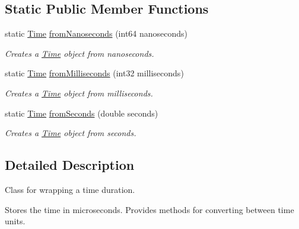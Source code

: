 \subsection*{Static Public Member Functions}
\begin{DoxyCompactItemize}
\item 
\mbox{\label{class_arcana_1_1_time_a82db96262751ea46d56f0fc6388efbcf}} 
static \mbox{\hyperlink{class_arcana_1_1_time}{Time}} \mbox{\hyperlink{class_arcana_1_1_time_a82db96262751ea46d56f0fc6388efbcf}{from\+Nanoseconds}} (int64 nanoseconds)
\begin{DoxyCompactList}\small\item\em Creates a \mbox{\hyperlink{class_arcana_1_1_time}{Time}} object from nanoseconds. \end{DoxyCompactList}\item 
\mbox{\label{class_arcana_1_1_time_a95ac577d056c4909dbf4d9cb43c64383}} 
static \mbox{\hyperlink{class_arcana_1_1_time}{Time}} \mbox{\hyperlink{class_arcana_1_1_time_a95ac577d056c4909dbf4d9cb43c64383}{from\+Milliseconds}} (int32 milliseconds)
\begin{DoxyCompactList}\small\item\em Creates a \mbox{\hyperlink{class_arcana_1_1_time}{Time}} object from milliseconds. \end{DoxyCompactList}\item 
\mbox{\label{class_arcana_1_1_time_ab2e8c472e70a57905da61551d6a5d0e3}} 
static \mbox{\hyperlink{class_arcana_1_1_time}{Time}} \mbox{\hyperlink{class_arcana_1_1_time_ab2e8c472e70a57905da61551d6a5d0e3}{from\+Seconds}} (double seconds)
\begin{DoxyCompactList}\small\item\em Creates a \mbox{\hyperlink{class_arcana_1_1_time}{Time}} object from seconds. \end{DoxyCompactList}\end{DoxyCompactItemize}


\subsection{Detailed Description}
Class for wrapping a time duration. 

Stores the time in microseconds. Provides methods for converting between time units. 

